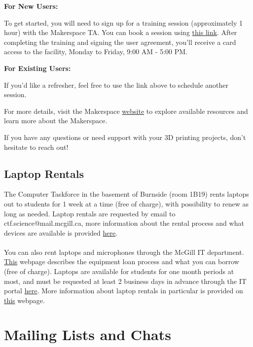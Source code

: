 \textbf{For New Users:}

To get started, you will need to sign up for a training session (approximately 1 hour) with the Makerspace TA. You can book a session using \href{https://bookings.cloud.microsoft/book/MakerspaceTraining1@McGill.onmicrosoft.com/?ismsaljsauthenabled}{this link}. After completing the training and signing the user agreement, you'll receive a card access to the facility, Monday to Friday, 9:00 AM - 5:00 PM.

\textbf{For Existing Users:}

If you'd like a refresher, feel free to use the link above to schedule another session.

For more details, visit the Makerspace \href{https://makerspace.physics.mcgill.ca/index.html}{website} to explore available resources and learn more about the Makerspace.

If you have any questions or need support with your 3D printing projects, don't hesitate to reach out!


    \subsection{Laptop Rentals} 

The Computer Taskforce in the basement of Burnside (room 1B19) rents laptops out to students for 1 week at a time (free of charge), with possibility to renew as long as needed. Laptop rentals are requested by email to ctf.science@mail.mcgill.ca, more information about the rental process and what devices are available is provided \href{https://ctf.mcgill.ca/for_students/laptop_lending.html}{here}.
\\\\
You can also rent laptops and microphones through the McGill IT department. \href{https://mcgill.service-now.com/itportal?id=kb_article_view&sysparm_article=KB0010873#How}{This} webpage describes the equipment loan process and what you can borrow (free of charge).  Laptops are available for students for one month periods at most, and must be requested at least 2 business days in advance through the IT portal \href{https://mcgill.service-now.com/itportal?id=sc_cat_item&sys_id=6b72b78d133437085a165d122244b035&sysparm_category=6aee4c914f4a9200b18f59dd0210c75e}{here}. More information about laptop rentals in particular is provided on \href{https://mcgill.service-now.com/itportal?id=kb_article_view&sysparm_article=KB0010885}{this} webpage.

    \section{Mailing Lists and Chats}

